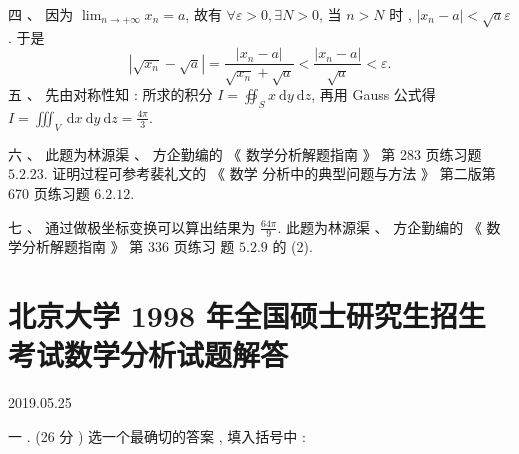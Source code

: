 \documentclass[10pt]{article}
\begin{document}
 四 、 因为  $\lim _{n \rightarrow+\infty} x_{n}=a$,  故有  $\forall \varepsilon>0, \exists N>0$,  当  $n>N$  时 , $\left|x_{n}-a\right|<\sqrt{a} \varepsilon$.  于是 
$$
\left|\sqrt{x_{n}}-\sqrt{a}\right|=\frac{\left|x_{n}-a\right|}{\sqrt{x_{n}}+\sqrt{a}}<\frac{\left|x_{n}-a\right|}{\sqrt{a}}<\varepsilon .
$$
 五 、 先由对称性知 :  所求的积分  $I=\oiint_{S} x \mathrm{~d} y \mathrm{~d} z$,  再用  Gauss  公式得  $I=\iiint_{V} \mathrm{~d} x \mathrm{~d} y \mathrm{~d} z=\frac{4 \pi}{3}$.

 六 、 此题为林源渠 、 方企勤编的 《 数学分析解题指南 》 第  283  页练习题  $5.2 .23$.  证明过程可参考裴礼文的 《 数学   分析中的典型问题与方法 》 第二版第  670  页练习题  $6.2 .12$.

 七 、 通过做极坐标变换可以算出结果为  $\frac{64 \pi}{9}$.  此题为林源渠 、 方企勤编的 《 数学分析解题指南 》 第  336  页练习   题  $5.2 .9$  的  (2).

\section{北京大学 1998 年全国硕士研究生招生考试数学分析试题解答}
   

2019.05.25

 一 . (26  分 )  选一个最确切的答案 ,  填入括号中 :
\end{document}
